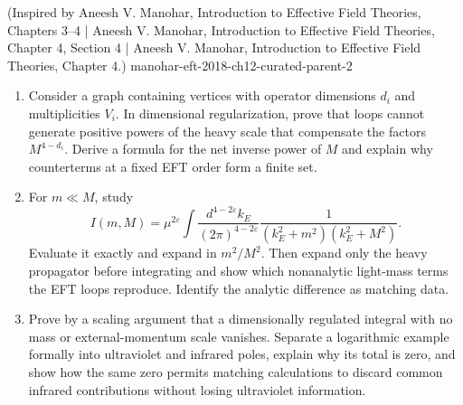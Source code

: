 \begin{enumerate}
  {(Inspired by Aneesh V. Manohar, Introduction to Effective Field Theories, Chapters 3--4 | Aneesh V. Manohar, Introduction to Effective Field Theories, Chapter 4, Section 4 | Aneesh V. Manohar, Introduction to Effective Field Theories, Chapter 4.)}
  {manohar-eft-2018-ch12-curated-parent-2}
\begin{enumerate}
\item
Consider a graph containing vertices with operator dimensions \(d_i\) and
multiplicities \(V_i\).  In dimensional regularization, prove that loops
cannot generate positive powers of the heavy scale that compensate the
factors \(M^{4-d_i}\).  Derive a formula for the net inverse power of \(M\)
and explain why counterterms at a fixed EFT order form a finite set.
\item
For \(m\ll M\), study
\[
 I(m,M)=\mu^{2\varepsilon}\int\frac{d^{4-2\varepsilon}k_E}{(2\pi)^{4-2\varepsilon}}
 \frac1{(k_E^2+m^2)(k_E^2+M^2)}.
\]
Evaluate it exactly and expand in \(m^2/M^2\).  Then expand only the heavy
propagator before integrating and show which nonanalytic light-mass terms
the EFT loops reproduce.  Identify the analytic difference as matching
data.
\item
Prove by a scaling argument that a dimensionally regulated integral with no
mass or external-momentum scale vanishes.  Separate a logarithmic example
formally into ultraviolet and infrared poles, explain why its total is zero,
and show how the same zero permits matching calculations to discard common
infrared contributions without losing ultraviolet information.
\end{enumerate}


\end{enumerate}
